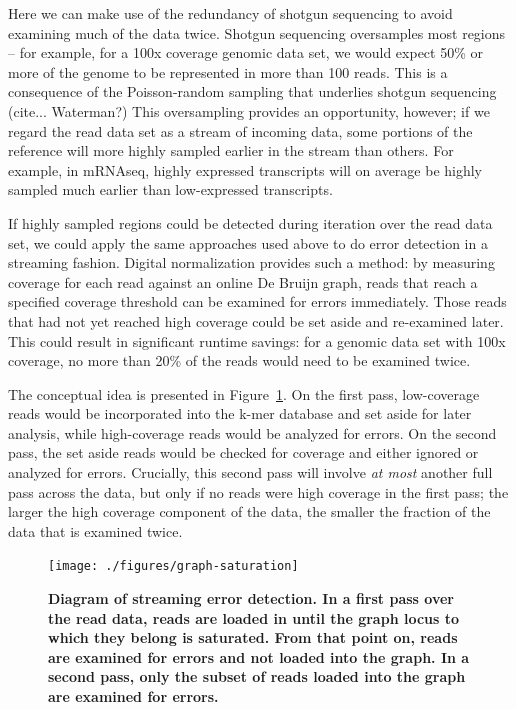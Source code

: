 \documentclass{article}
\begin{document}
Here we can make use of the redundancy of shotgun sequencing to avoid
examining much of the data twice. Shotgun
sequencing oversamples most regions -- for example, for a 100x
coverage genomic data set, we would expect 50\% or more of the genome
to be represented in more than 100 reads.  This is a consequence of
the Poisson-random sampling that underlies shotgun sequencing
(cite... Waterman?)  This oversampling provides an opportunity,
however; if we regard the read data set as a stream of incoming data,
some portions of the reference will more highly sampled earlier in the
stream than others.  For example, in mRNAseq, highly expressed
transcripts will on average be highly sampled much earlier than
low-expressed transcripts.

If highly sampled regions could be detected during iteration over the
read data set, we could apply the same approaches used above to do
error detection in a streaming fashion.  Digital normalization
provides such a method: by measuring coverage for each read against an
online De Bruijn graph, reads that reach a specified coverage
threshold can be examined for errors immediately.  Those reads that
had not yet reached high coverage could be set aside and re-examined
later.  This could result in significant runtime savings: for a
genomic data set with 100x coverage, no more than 20\% of the reads
would need to be examined twice.

The conceptual idea is presented in Figure~\ref{fig:concept}.  On the
first pass, low-coverage reads would be incorporated into the k-mer
database and set aside for later analysis, while high-coverage reads
would be analyzed for errors. On the second pass, the set aside reads
would be checked for coverage and either ignored or analyzed for
errors.  Crucially, this second pass will involve {\em at most}
another full pass across the data, but only if no reads were high
coverage in the first pass; the larger the high coverage component
of the data, the smaller the fraction of the data that is examined twice.

\begin{figure}[!ht]
 \centerline{\texttt{[image: ./figures/graph-saturation]}}
\caption{\bf Diagram of streaming error detection. In a first pass
over the read data, reads are loaded in until the graph locus to which
they belong is saturated.  From that point on, reads are examined for
errors and not loaded into the graph.  In a second pass, only the subset
of reads loaded into the graph are examined for errors.}
\label{fig:concept}
\end{figure}
\end{document}
